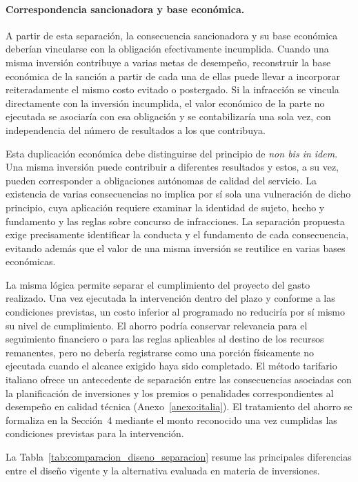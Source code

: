 \paragraph{Correspondencia sancionadora y base económica.}

A partir de esta separación, la consecuencia sancionadora y su base económica deberían vincularse con la obligación efectivamente incumplida. Cuando una misma inversión contribuye a varias metas de desempeño, reconstruir la base económica de la sanción a partir de cada una de ellas puede llevar a incorporar reiteradamente el mismo costo evitado o postergado. Si la infracción se vincula directamente con la inversión incumplida, el valor económico de la parte no ejecutada se asociaría con esa obligación y se contabilizaría una sola vez, con independencia del número de resultados a los que contribuya.

Esta duplicación económica debe distinguirse del principio de \emph{non bis in idem}. Una misma inversión puede contribuir a diferentes resultados y estos, a su vez, pueden corresponder a obligaciones autónomas de calidad del servicio. La existencia de varias consecuencias no implica por sí sola una vulneración de dicho principio, cuya aplicación requiere examinar la identidad de sujeto, hecho y fundamento y las reglas sobre concurso de infracciones. La separación propuesta exige precisamente identificar la conducta y el fundamento de cada consecuencia, evitando además que el valor de una misma inversión se reutilice en varias bases económicas.

La misma lógica permite separar el cumplimiento del proyecto del gasto realizado. Una vez ejecutada la intervención dentro del plazo y conforme a las condiciones previstas, un costo inferior al programado no reduciría por sí mismo su nivel de cumplimiento. El ahorro podría conservar relevancia para el seguimiento financiero o para las reglas aplicables al destino de los recursos remanentes, pero no debería registrarse como una porción físicamente no ejecutada cuando el alcance exigido haya sido completado. El método tarifario italiano ofrece un antecedente de separación entre las consecuencias asociadas con la planificación de inversiones y los premios o penalidades correspondientes al desempeño en calidad técnica (Anexo~\ref{anexo:italia}). El tratamiento del ahorro se formaliza en la Sección~4 mediante el monto reconocido una vez cumplidas las condiciones previstas para la intervención.

La Tabla~\ref{tab:comparacion_diseno_separacion} resume las principales diferencias entre el diseño vigente y la alternativa evaluada en materia de inversiones.

